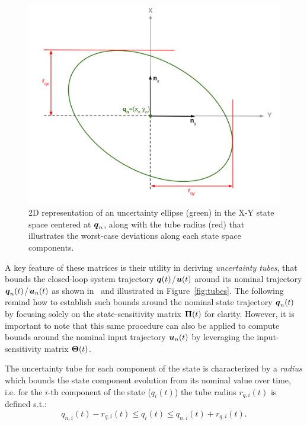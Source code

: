 \begin{figure} [t]
  \centering
  \includegraphics[width=0.6\linewidth]{figures/models/radius.png} 
  \caption{2D representation of an uncertainty ellipse (green) in the X-Y state space centered at $\boldsymbol{q}_n$, along with the tube radius (red) that illustrates the worst-case deviations along each state space components.}%
  \label{fig:ellips_radius}%
\end{figure}

A key feature of these matrices is their utility in deriving \emph{uncertainty tubes}, that bounds the closed-loop system trajectory $\boldsymbol{q}(t)$/$\boldsymbol{u}(t)$ around its nominal trajectory $\boldsymbol{q}_n(t)$/$\boldsymbol{u}_n(t)$ as shown in~\cite{cTube} and illustrated in Figure~\ref{fig:tubes}.
The following remind how to establish such bounds around the nominal state trajectory $\boldsymbol{q}_n(t)$ by focusing solely on the state-sensitivity matrix $\boldsymbol{\Pi}(t)$ for clarity. 
However, it is important to note that this same procedure can also be applied to compute bounds around the nominal input trajectory $\boldsymbol{u}_n(t)$ by leveraging the input-sensitivity matrix $\boldsymbol{\Theta}(t)$.

The uncertainty tube for each component of the state is characterized by a \emph{radius} which bounds the state component evolution from its nominal value over time, i.e. for the $i$-th component of the state ($q_i(t)$) the tube radius $r_{q,i}(t)$ is defined s.t.:
\begin{equation}\label{eq:bounds_q}
  q_{n,i}(t) - r_{q,i}(t) \leq q_i(t) \leq q_{n,i}(t) + r_{q,i}(t).
\end{equation}

